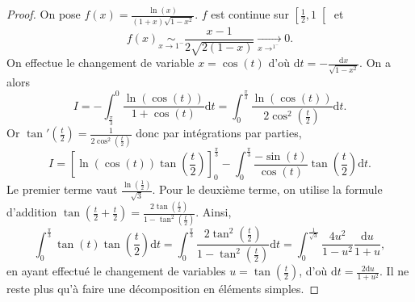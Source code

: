 \documentclass[12pt]{article}
\begin{document}
\begin{proof}
    On pose $f(x)=\frac{\ln(x)}{(1+x)\sqrt{1-x^{2}}}$. $f$ est continue sur $\left[\frac{1}{2},1\right[$ et 
    \begin{equation*}
        f(x)\underset{x\to1^{-}}{\sim}\frac{x-1}{2\sqrt{2(1-x)}}\xrightarrow[x\to^{1^{-}}]{}0.    
    \end{equation*}
    On effectue le changement de variable $x=\cos(t)$ d'où $\mathrm{d}t=-\frac{\mathrm{d}x}{\sqrt{1-x^{2}}}$. On a alors 
    \begin{equation*}
        I=-\int_{\frac{\pi}{3}}^{0}\frac{\ln(\cos(t))}{1+\cos(t)}\mathrm{d}t=\int_{0}^{\frac{\pi}{3}}\frac{\ln(\cos(t))}{2\cos^{2}\left(\frac{t}{2}\right)}\mathrm{d}t.
    \end{equation*}
    Or $\tan'\left(\frac{t}{2}\right)=\frac{1}{2\cos^{2}\left(\frac{t}{2}\right)}$ donc par intégrations par parties,
    \begin{equation*}
        I=\left[\ln(\cos(t))\tan\left(\frac{t}{2}\right)\right]_{0}^{\frac{\pi}{3}}-\int_{0}^{\frac{\pi}{3}}\frac{-\sin(t)}{\cos(t)}\tan\left(\frac{t}{2}\right)\mathrm{d}t.
    \end{equation*}
    Le premier terme vaut $\frac{\ln(\frac{1}{2})}{\sqrt{3}}$.
    Pour le deuxième terme, on utilise la formule d'addition $\tan\left(\frac{t}{2}+\frac{t}{2}\right)=\frac{2\tan\left(\frac{t}{2}\right)}{1-\tan^{2}\left(\frac{t}{2}\right)}$. Ainsi,
    \begin{equation*}
        \int_{0}^{\frac{\pi}{3}}\tan(t)\tan\left(\frac{t}{2}\right)\mathrm{d}t=\int_{0}^{\frac{\pi}{3}}\frac{2\tan^{2}\left(\frac{t}{2}\right)}{1-\tan^{2}\left(\frac{t}{2}\right)}\mathrm{d}t=\int_{0}^{\frac{1}{\sqrt{3}}}\frac{4u^{2}}{1-u^{2}}\frac{\mathrm{d}u}{1+u},
    \end{equation*}
    en ayant effectué le changement de variables $u=\tan\left(\frac{t}{2}\right)$, d'où $\mathrm{d}t=\frac{2\mathrm{d}u}{1+u^{2}}$. Il ne reste plus qu'à faire une décomposition en éléments simples.
\end{proof}
\end{document}
